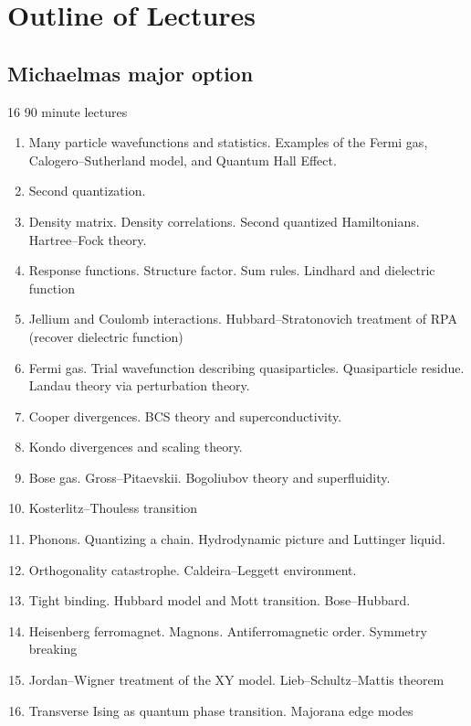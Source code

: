 \section{Outline of Lectures}

\subsection{Michaelmas major option}

16 90 minute lectures

\begin{enumerate}
\item Many particle wavefunctions and statistics. Examples of the Fermi gas, Calogero--Sutherland model, and Quantum Hall Effect.

\item Second quantization. 

\item Density matrix. Density correlations. Second quantized Hamiltonians. Hartree--Fock theory.

\item Response functions. Structure factor. Sum rules. Lindhard and dielectric function

\item Jellium and Coulomb interactions. Hubbard--Stratonovich treatment of RPA (recover dielectric function)

\item Fermi gas. Trial wavefunction describing quasiparticles. Quasiparticle residue. Landau theory via perturbation theory. 

\item Cooper divergences. BCS theory and superconductivity. 

\item Kondo divergences and scaling theory.

\item Bose gas. Gross--Pitaevskii. Bogoliubov theory and superfluidity.

\item Kosterlitz--Thouless transition

\item Phonons. Quantizing a chain. Hydrodynamic picture and Luttinger liquid.

\item Orthogonality catastrophe. Caldeira--Leggett environment.

\item Tight binding. Hubbard model and Mott transition. Bose--Hubbard.

\item Heisenberg ferromagnet. Magnons. Antiferromagnetic order. Symmetry breaking

\item Jordan--Wigner treatment of the XY model. Lieb--Schultz--Mattis theorem

\item Transverse Ising as quantum phase transition. Majorana edge modes

\end{enumerate}

